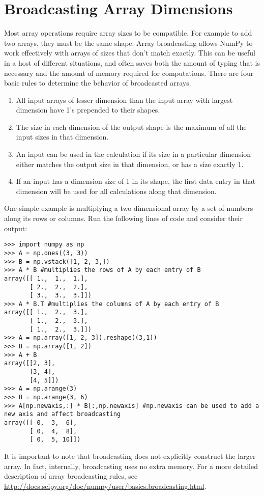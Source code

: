 \section*{Broadcasting Array Dimensions}
Most array operations require array sizes to be compatible.
For example to add two arrays, they must be the same shape.
Array broadcasting allows NumPy to work effectively with arrays of sizes that don't match exactly. 
This can be useful in a host of different situations, and often saves both the 
amount of typing that is necessary and the amount of memory required for computations. 
There are four basic rules to determine the behavior of broadcasted arrays.
\begin{enumerate}
\item All input arrays of lesser dimension than the input array with largest dimension have 1's prepended to their shapes.
\item The size in each dimension of the output shape is the maximum of all the input sizes in that dimension.
\item An input can be used in the calculation if its size in a particular dimension either matches the output size in that dimension, or has a size exactly 1.
\item If an input has a dimension size of 1 in its shape, the first data entry in that dimension will be used for all calculations along that dimension.
\end{enumerate}

One simple example is multiplying a two dimensional array by a set of numbers along its rows or columns.
Run the following lines of code and consider their output:
\begin{lstlisting}
>>> import numpy as np
>>> A = np.ones((3, 3))
>>> B = np.vstack([1, 2, 3,])
>>> A * B #multiplies the rows of A by each entry of B
array([[ 1.,  1.,  1.],
       [ 2.,  2.,  2.],
       [ 3.,  3.,  3.]])
>>> A * B.T #multiplies the columns of A by each entry of B
array([[ 1.,  2.,  3.],
       [ 1.,  2.,  3.],
       [ 1.,  2.,  3.]])
>>> A = np.array([1, 2, 3]).reshape((3,1))
>>> B = np.array([1, 2])
>>> A + B
array([[2, 3],
       [3, 4],
       [4, 5]])
>>> A = np.arange(3)
>>> B = np.arange(3, 6)
>>> A[np.newaxis,:] * B[:,np.newaxis] #np.newaxis can be used to add a new axis and affect broadcasting
array([[ 0,  3,  6],
       [ 0,  4,  8],
       [ 0,  5, 10]])
\end{lstlisting}
It is important to note that broadcasting does not explicitly construct the larger array.
In fact, internally, broadcasting uses no extra memory.
For a more detailed description of array broadcasting rules, see \url{http://docs.scipy.org/doc/numpy/user/basics.broadcasting.html}.

